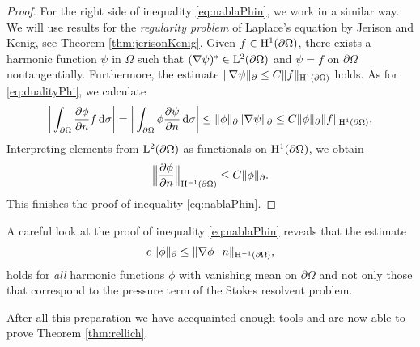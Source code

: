 \begin{proof}
  For the right side of inequality \eqref{eq:nablaPhin}, we work in a similar way.
  We will use results for the \emph{regularity problem} of Laplace's equation by Jerison and Kenig, see Theorem \ref{thm:jerisonKenig}.
  Given $f \in \mathrm{H}^1(\partial\Omega)$, there exists a harmonic function $\psi$ in $\Omega$ such that $(\nabla\psi)^* \in \mathrm{L}^2(\partial\Omega)$ and $\psi = f$ on $\partial\Omega$ nontangentially. Furthermore, the estimate $\|\nabla \psi\|_\partial \leq C \|f\|_{\mathrm{H}^1(\partial\Omega)}$ holds.
  As for \eqref{eq:dualityPhi}, we calculate
  \begin{align*}
    \bigg| \int_{\partial\Omega} \frac{\partial\phi}{\partial n} f \, {\operatorname{d}\!{\sigma}} \bigg|
    = \bigg| \int_{\partial\Omega} \phi \frac{\partial \psi}{\partial n} \, {\operatorname{d}\!{\sigma}} \bigg| 
    \leq \|\phi\|_{\partial} \|\nabla \psi \|_\partial 
    \leq C \|\phi\|_\partial \|f\|_{\mathrm{H}^1(\partial\Omega)},
  \end{align*}
  Interpreting elements from $\mathrm{L}^2(\partial\Omega)$ as functionals on $\mathrm{H}^1(\partial\Omega)$, we obtain
  \begin{align*}
    \Big\|\frac{\partial\phi}{\partial n} \Big\|_{\mathrm{H}^{-1}(\partial\Omega)} \leq C \|\phi\|_\partial. 
  \end{align*}
  This finishes the proof of inequality \eqref{eq:nablaPhin}.
\end{proof}

\begin{rem}
  \label{rem:harmonicEstimate}
  A careful look at the proof of inequality \eqref{eq:nablaPhin} reveals that the estimate
  \begin{align*}
    c\, \| \phi \|_\partial \leq \| \nabla \phi \cdot n \|_{\mathrm{H}^{-1}(\partial\Omega)},
  \end{align*}
  holds for \emph{all} harmonic functions $\phi$ with vanishing mean on $\partial\Omega$ and not only those that correspond to the pressure term of the Stokes resolvent problem.
\end{rem}

After all this preparation we have accquainted enough tools and are now able to prove Theorem \ref{thm:rellich}.

